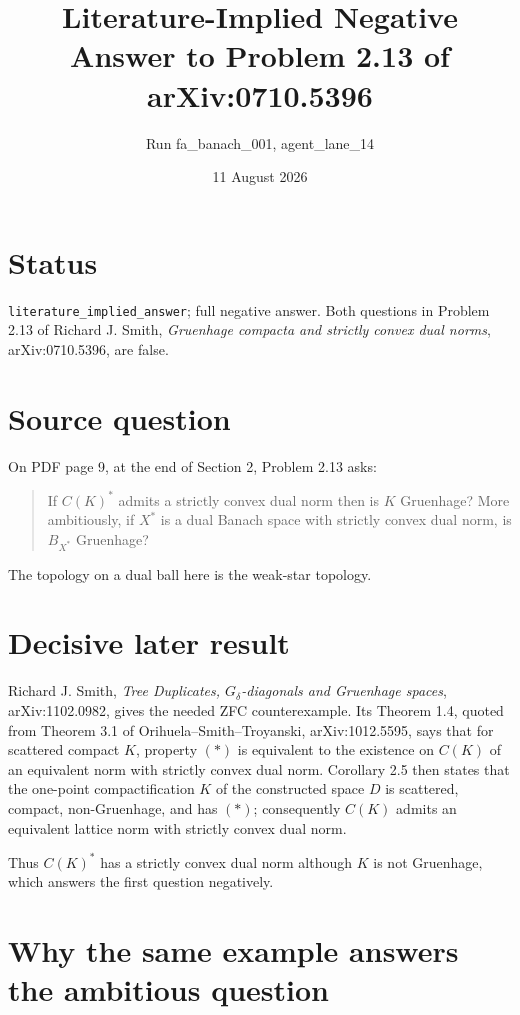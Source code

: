 \documentclass[11pt]{article}
\title{Literature-Implied Negative Answer to Problem 2.13 of arXiv:0710.5396}
\author{Run fa\_banach\_001, agent\_lane\_14}
\date{11 August 2026}
\begin{document}
\maketitle

\section*{Status}

\texttt{literature\_implied\_answer}; full negative answer.  Both questions
in Problem 2.13 of Richard J. Smith, \emph{Gruenhage compacta and strictly
convex dual norms}, arXiv:0710.5396, are false.

\section*{Source question}

On PDF page 9, at the end of Section 2, Problem 2.13 asks:
\begin{quote}
If $C(K)^*$ admits a strictly convex dual norm then is $K$ Gruenhage?
More ambitiously, if $X^*$ is a dual Banach space with strictly convex dual
norm, is $B_{X^*}$ Gruenhage?
\end{quote}
The topology on a dual ball here is the weak-star topology.

\section*{Decisive later result}

Richard J. Smith, \emph{Tree Duplicates, $G_\delta$-diagonals and Gruenhage
spaces}, arXiv:1102.0982, gives the needed ZFC counterexample.  Its Theorem
1.4, quoted from Theorem 3.1 of Orihuela--Smith--Troyanski,
arXiv:1012.5595, says that for scattered compact $K$, property $(*)$ is
equivalent to the existence on $C(K)$ of an equivalent norm with strictly
convex dual norm.  Corollary 2.5 then states that the one-point compactification
$K$ of the constructed space $D$ is scattered, compact, non-Gruenhage, and has
$(*)$; consequently $C(K)$ admits an equivalent lattice norm with strictly
convex dual norm.

Thus $C(K)^*$ has a strictly convex dual norm although $K$ is not Gruenhage,
which answers the first question negatively.

\section*{Why the same example answers the ambitious question}
\end{document}
